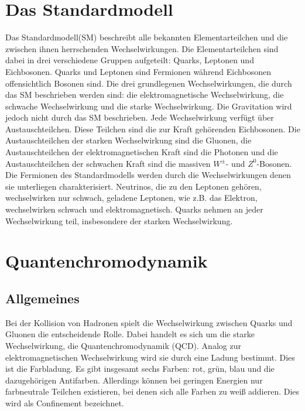\section{Das Standardmodell}
Das Standardmodell(SM) beschreibt alle bekannten Elementarteilchen und die zwischen ihnen herrschenden Wechselwirkungen. Die Elementarteilchen sind dabei in drei verschiedene Gruppen aufgeteilt: Quarks, Leptonen und Eichbosonen. Quarks und Leptonen sind Fermionen während Eichbosonen offensichtlich Bosonen sind. Die drei grundlegenen Wechselwirkungen, die durch das SM beschrieben werden sind: die elektromagnetische Wechselwirkung, die schwache Wechselwirkung und die starke Wechselwirkung. Die Gravitation wird jedoch nicht durch das SM beschrieben.
Jede Wechselwirkung verfügt über Austauschteilchen. Diese Teilchen sind die zur Kraft gehörenden Eichbosonen. Die Austauschteilchen der starken Wechselwirkung sind die Gluonen, die Austauschteilchen der elektromagnetischen Kraft sind die Photonen und die Austauschteilchen der schwachen Kraft sind die massiven $W^{\pm}$- und $Z^{0}$-Bosonen.
Die Fermionen des Standardmodells werden durch die Wechselwirkungen denen sie unterliegen charakterisiert. Neutrinos, die zu den Leptonen gehören, wechselwirken nur schwach, geladene Leptonen, wie z.B. das Elektron, wechselwirken schwach und elektromagnetisch. Quarks nehmen an jeder Wechselwirkung teil, insbesondere der starken Wechselwirkung\cite{halzen2008quark}.

\section{Quantenchromodynamik}
\subsection{Allgemeines}
Bei der Kollision von Hadronen spielt die Wechselwirkung zwischen Quarks und Gluonen die entscheidende Rolle. Dabei handelt es sich um die starke Wechselwirkung, die Quantenchromodynamik (QCD). Analog zur elektromagnetischen Wechselwirkung wird sie durch eine Ladung bestimmt. Dies ist die Farbladung. Es gibt insgesamt sechs Farben: rot, grün, blau und die dazugehörigen Antifarben. Allerdings können bei geringen Energien nur farbneutrale Teilchen existieren, bei denen sich alle Farben zu weiß addieren. Dies wird als Confinement bezeichnet\cite{halzen2008quark}.

